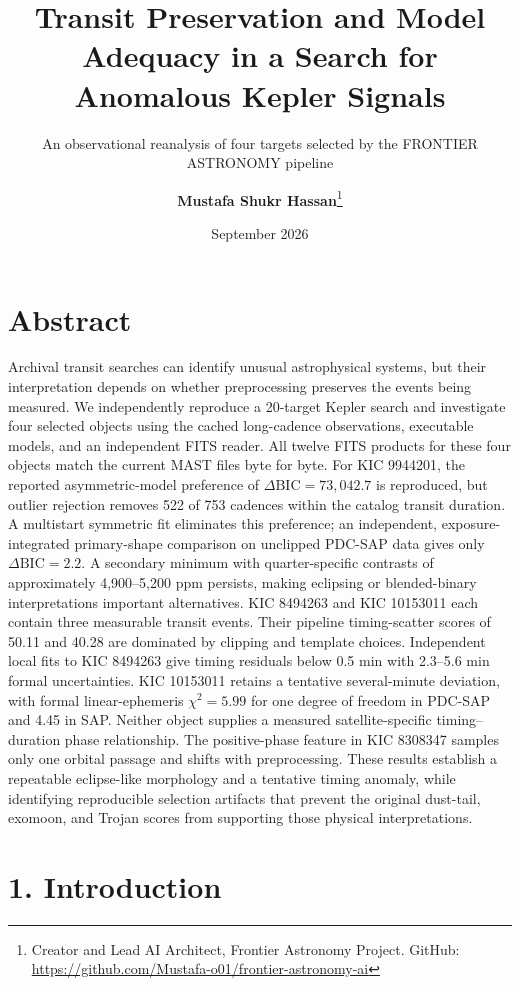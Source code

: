 \documentclass[
  english,
]{article}
\title{Transit Preservation and Model Adequacy in a Search for Anomalous
Kepler Signals}
\subtitle{An observational reanalysis of four targets selected by the
FRONTIER ASTRONOMY pipeline}
\author{\textbf{Mustafa Shukr Hassan}\thanks{Creator and Lead AI Architect, Frontier Astronomy Project. GitHub: \url{https://github.com/Mustafa-o01/frontier-astronomy-ai}}}
\date{September 2026}
\begin{document}
\maketitle

\section{Abstract}\label{abstract}

Archival transit searches can identify unusual astrophysical systems,
but their interpretation depends on whether preprocessing preserves the
events being measured. We independently reproduce a 20-target Kepler
search and investigate four selected objects using the cached
long-cadence observations, executable models, and an independent FITS
reader. All twelve FITS products for these four objects match the
current MAST files byte for byte. For KIC 9944201, the reported
asymmetric-model preference of \(\Delta\mathrm{BIC}=73{,}042.7\) is
reproduced, but outlier rejection removes 522 of 753 cadences within the
catalog transit duration. A multistart symmetric fit eliminates this
preference; an independent, exposure-integrated primary-shape comparison
on unclipped PDC-SAP data gives only \(\Delta\mathrm{BIC}=2.2\). A
secondary minimum with quarter-specific contrasts of approximately
4,900--5,200 ppm persists, making eclipsing or blended-binary
interpretations important alternatives. KIC 8494263 and KIC 10153011
each contain three measurable transit events. Their pipeline
timing-scatter scores of 50.11 and 40.28 are dominated by clipping and
template choices. Independent local fits to KIC 8494263 give timing
residuals below 0.5 min with 2.3--5.6 min formal uncertainties. KIC
10153011 retains a tentative several-minute deviation, with formal
linear-ephemeris \(\chi^2=5.99\) for one degree of freedom in PDC-SAP
and 4.45 in SAP. Neither object supplies a measured satellite-specific
timing--duration phase relationship. The positive-phase feature in KIC
8308347 samples only one orbital passage and shifts with preprocessing.
These results establish a repeatable eclipse-like morphology and a
tentative timing anomaly, while identifying reproducible selection
artifacts that prevent the original dust-tail, exomoon, and Trojan
scores from supporting those physical interpretations.

\section{1. Introduction}\label{introduction}
\end{document}
